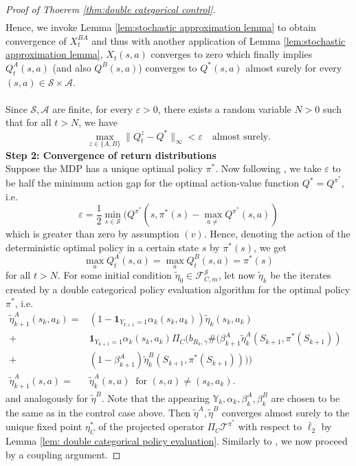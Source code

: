 \documentclass{article}
\newcommand{\cA}{\mathcal{A}}
\newcommand{\cF}{\mathcal{F}}
\newcommand{\cS}{\mathcal{S}}
\newcommand{\cT}{\mathcal{T}}
\newcommand{\Y}{\mathbb{Y}}
\theoremstyle{plain}
\theoremstyle{definition}
\theoremstyle{remark}
\begin{document}
\begin{proof}[Proof of Thoerem \ref{thm:double categorical control}]
\begin{align*}
    \end{align*}
    Hence, we invoke Lemma \ref{lem:stochastic approximation lemma} to obtain convergence of $X^{BA}_t$ and thus with another application of Lemma \ref{lem:stochastic approximation lemma}, $X_t(s,a)$ converges to zero which finally implies $Q^A_t(s,a)$ (and also $Q^B(s,a)$) converges to $Q^*(s,a)$ almost surely for every $(s,a)\in\cS\times\cA.$\\\\
    Since $\cS,\cA$ are finite, for every $\varepsilon>0$, there exists a random variable $N>0$ such that for all $t>N$, we have
    \[\max_{z\in\{A,B\}}\|Q_t^z-Q^*\|_\infty<\varepsilon\quad \text{almost surely.}\]
    \textbf{Step 2: Convergence of return distributions}\\
    Suppose the MDP has a unique optimal policy $\pi^*$. Now following \cite{rowland18}, we take $\varepsilon$ to be half the minimum action gap for the optimal action-value function $Q^*=Q^{\pi^*}$, i.e.
    \[\varepsilon=\frac{1}{2}\min_{s\in\cS}(Q^{\pi^*}(s,\pi^*(s)-\max_{a\neq}Q^{\pi^*}(s,a))\]
    which is greater than zero by assumption $(v).$
    Hence, denoting the action of the deterministic optimal policy in a certain state $s$ by $\pi^*(s)$, we get
    \[\max_aQ^A_t(s,a)=\max_aQ^B_t(s,a)=\pi^*(s)\]
    for all $t>N.$
    For some initial condition $\tilde \eta_0\in\cF_{C,m}^\cS$, let now $\tilde\eta_k$ be the iterates created by a double categorical policy evaluation algorithm for the optimal policy $\pi^*$, i.e.
    \begin{align*}
        \tilde\eta_{k+1}^A(s_k,a_k)=&(1-\textbf{1}_{Y_{k+1}=1}\alpha_k(s_k,a_k))\tilde\eta_{k}(s_k,a_k)\\
+&\textbf{1}_{Y_{k+1}=1}\alpha_k(s_k,a_k)\Pi_C\bigg(b_{R_k,\gamma}\#\Big(\beta^A_{k+1}\tilde\eta^A_k(S_{k+1},\pi^*(S_{k+1}))\\
    +&(1-\beta^A_{k+1})\tilde\eta^B_k(S_{k+1},\pi^*(S_{k+1}))\Big)\bigg)\\
        \tilde\eta_{k+1}^A(s,a)=&\tilde\eta^A_{k}(s,a)\ \text{ for }(s,a)\neq(s_k,a_k).&
    \end{align*}
    and analogously for $\tilde \eta^B.$ Note that the appearing $\Y_k,\alpha_k,\beta^A_k,\beta_k^B$ are chosen to be the same as in the control case above.
    Then $\tilde\eta^A,\tilde\eta^B$ converges almost surely to the unique fixed point $\eta^*_C$ of the projected operator $\Pi_C\cT^{\pi^*}$ with respect to $\bar\ell_2$ by Lemma \ref{lem: double categorical policy evaluation}.
    Similarly to \cite{rowland18}, we now proceed by a coupling argument. 

\end{proof}
\end{document}
